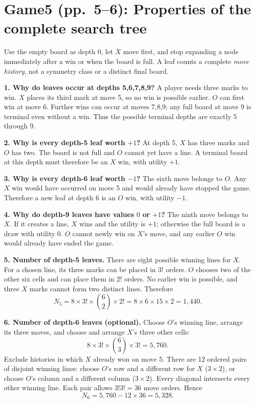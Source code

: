 \documentclass[11pt,a4paper]{article}
\newcommand{\question}[2]{\section*{#1: #2}}
\begin{document}
\newpage
\question{Game5 (pp.\ 5--6)}{Properties of the complete search tree}
Use the empty board as depth 0, let $X$ move first, and stop expanding a node immediately after a win or when the board is full. A leaf counts a complete \emph{move history}, not a symmetry class or a distinct final board.

\textbf{1. Why do leaves occur at depths 5,6,7,8,9?}
A player needs three marks to win. $X$ places its third mark at move 5, so no win is possible earlier. $O$ can first win at move 6. Further wins can occur at moves 7,8,9; any full board at move 9 is terminal even without a win. Thus the possible terminal depths are exactly 5 through 9.

\textbf{2. Why is every depth-5 leaf worth $+1$?}
At depth 5, $X$ has three marks and $O$ has two. The board is not full and $O$ cannot yet have a line. A terminal board at this depth must therefore be an $X$ win, with utility $+1$.

\textbf{3. Why is every depth-6 leaf worth $-1$?}
The sixth move belongs to $O$. Any $X$ win would have occurred on move 5 and would already have stopped the game. Therefore a new leaf at depth 6 is an $O$ win, with utility $-1$.

\textbf{4. Why do depth-9 leaves have values $0$ or $+1$?}
The ninth move belongs to $X$. If it creates a line, $X$ wins and the utility is $+1$; otherwise the full board is a draw with utility 0. $O$ cannot newly win on $X$'s move, and any earlier $O$ win would already have ended the game.

\textbf{5. Number of depth-5 leaves.}
There are eight possible winning lines for $X$. For a chosen line, its three marks can be placed in $3!$ orders. $O$ chooses two of the other six cells and can place them in $2!$ orders. No earlier win is possible, and three $X$ marks cannot form two distinct lines. Therefore
\[
N_5=8\times3!\times\binom62\times2!
=8\times6\times15\times2=\boxed{1,440}.
\]

\textbf{6. Number of depth-6 leaves (optional).}
Choose $O$'s winning line, arrange its three moves, and choose and arrange $X$'s three other cells:
\[
8\times3!\times\binom63\times3!=5,760.
\]
Exclude histories in which $X$ already won on move 5. There are 12 ordered pairs of disjoint winning lines: choose $O$'s row and a different row for $X$ ($3\times2$), or choose $O$'s column and a different column ($3\times2$). Every diagonal intersects every other winning line. Each pair allows $3!3!=36$ move orders. Hence
\[
N_6=5,760-12\times36=\boxed{5,328}.
\]
\end{document}
